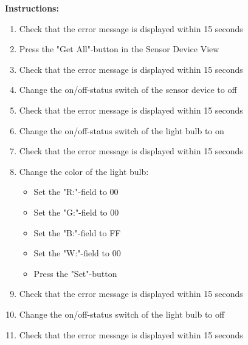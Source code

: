 \documentclass[a4paper]{article}
\newlength{\testlabellength}
\newenvironment{testlist}{\begin{enumerate}[label=\bfseries Instruction \thesubsection.\arabic* , labelindent=0pt, labelwidth=\testlabellength , leftmargin=2cm]}{\end{enumerate}}
\newenvironment{instruction}{
\textbf{Instructions:}
\begin{enumerate}[label=\bfseries  \arabic*., labelindent=0cm, labelwidth=2cm , leftmargin=1cm]
}
{\end{enumerate}}
\begin{document}
\begin{appendices}
\begin{testlist}
\begin{instruction}
			\item Check that the error message is displayed within 15 seconds
			\item Press the "Get All"-button in the Sensor Device View
			\item Check that the error message is displayed within 15 seconds
			\item Change the on/off-status switch of the sensor device to off
			\item Check that the error message is displayed within 15 seconds
			\item Change the on/off-status switch of the light bulb to on
			\item Check that the error message is displayed within 15 seconds
			\item Change the color of the light bulb:
			\begin{itemize}
				\item Set the "R:"-field to 00
				\item Set the "G:"-field to 00
				\item Set the "B:"-field to FF
				\item Set the "W:"-field to 00
				\item Press the "Set"-button
			\end{itemize}
			\item Check that the error message is displayed within 15 seconds
			\item Change the on/off-status switch of the light bulb to off
			\item Check that the error message is displayed within 15 seconds
		\end{instruction}

\end{testlist}

\clearpage

\end{appendices}
\end{document}
